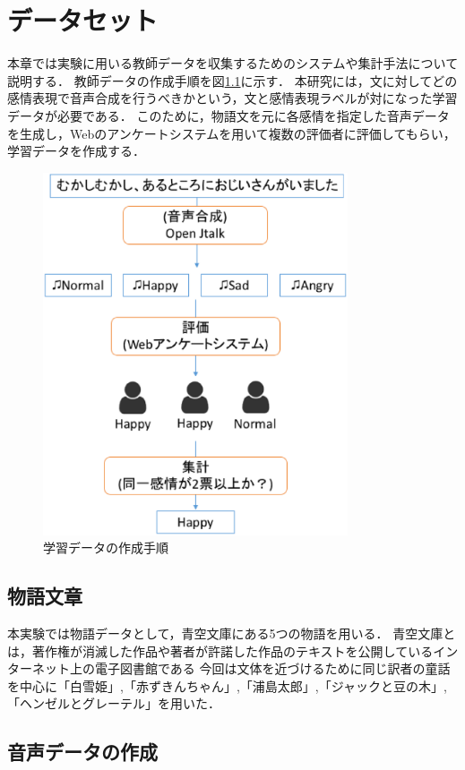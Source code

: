 \chapter{データセット}
本章では実験に用いる教師データを収集するためのシステムや集計手法について説明する．
教師データの作成手順を図\ref{fig:enquete}に示す．
本研究には，文に対してどの感情表現で音声合成を行うべきかという，文と感情表現ラベルが対になった学習データが必要である．
このために，物語文を元に各感情を指定した音声データを生成し，Webのアンケートシステムを用いて複数の評価者に評価してもらい，学習データを作成する．

\begin{figure}[hb]
  \begin{center}
    \includegraphics[clip,width=9.0cm]{fig/enquete.eps}
    \caption{学習データの作成手順}
    \label{fig:enquete}
  \end{center}
\end{figure}

\section{物語文章}
本実験では物語データとして，青空文庫\cite{aozora}にある5つの物語を用いる．
青空文庫とは，著作権が消滅した作品や著者が許諾した作品のテキストを公開しているインターネット上の電子図書館である
今回は文体を近づけるために同じ訳者の童話を中心に「白雪姫」,「赤ずきんちゃん」,「浦島太郎」,「ジャックと豆の木」,「ヘンゼルとグレーテル」を用いた．

\section{音声データの作成}

